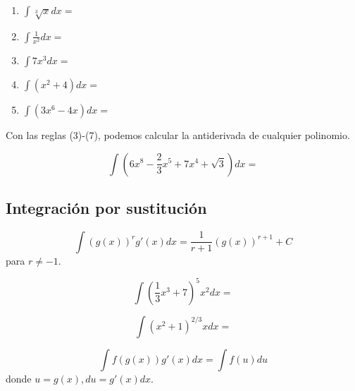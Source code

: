  \begin{resuelto}
  \label{soc:exmp:22.3}
  \begin{enumerate}
   \item $\int \sqrt[3]{x}dx=$

   \item $\int \frac{1}{x^{2}}dx=$

   \item $\int 7x^{3}dx=$

   \item $\int \left( x^{2}+4 \right)dx=$

   \item $\int \left( 3x^{6}-4x \right)dx=$

  \end{enumerate}

 \end{resuelto}




  Con las reglas (3)-(7), podemos calcular la antiderivada de cualquier polinomio.
 \begin{resuelto}
  \label{soc:exmp:22.4}
  $$\int \left( 6x^{8}-\frac{2}{3}x^{5}+7x^{4}+\sqrt{3} \right)dx=$$
 \end{resuelto}



\subsection{Integración por sustitución}


 \begin{proposicion}
 \label{regla:8}
 $$\int \left( g(x) \right)^{r}g'(x)dx=
 \dfrac{1}{r+1}\left( g(x) \right)^{r+1}+C
 $$ para $r\neq -1.$
 \end{proposicion}




 \begin{resuelto}
  \label{soc:exmp:22.5}
  $$
  \int \left( \dfrac{1}{3}x^{3}+7 \right)^{5}x^{2}dx=
  $$
 \end{resuelto}




 \begin{resuelto}
  \label{soc:exmp:22.6}
  $$
  \int \left( x^{2}+1 \right)^{2/3}xdx=
  $$
 \end{resuelto}




 \begin{proposicion}
  \label{regla:9}
  $$
  \int f\left( g(x) \right)g'(x)dx=\int f(u)du
  $$
  donde $u=g(x), du=g'(x)dx.$
 \end{proposicion}

